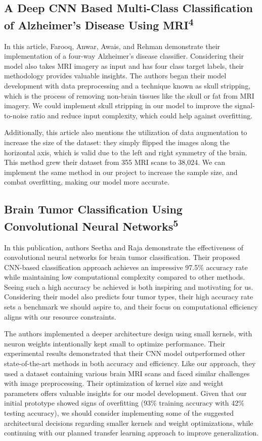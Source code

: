 \documentclass[conference]{IEEEtran}
\begin{document}
\subsection{\large A Deep CNN Based Multi-Class Classification of Alzheimer's Disease Using MRI\textsuperscript{4}}

In this article, Farooq, Anwar, Awais, and Rehman demonstrate their implementation of a four-way Alzheimer's disease classifier. Considering their model also takes MRI imagery as input and has four class target labels, their methodology provides valuable insights. The authors began their model development with data preprocessing and a technique known as skull stripping, which is the process of removing non-brain tissues like the skull or fat from MRI imagery. We could implement skull stripping in our model to improve the signal-to-noise ratio and reduce input complexity, which could help against overfitting. 

Additionally, this article also mentions the utilization of data augmentation to increase the size of the dataset: they simply flipped the images along the horizontal axis, which is valid due to the left and right symmetry of the brain. This method grew their dataset from 355 MRI scans to 38,024. We can implement the same method in our project to increase the sample size, and combat overfitting, making our model more accurate.

\subsection{\large Brain Tumor Classification Using Convolutional Neural Networks\textsuperscript{5}}

In this publication, authors Seetha and Raja demonstrate the effectiveness of convolutional neural networks for brain tumor classification. Their proposed CNN-based classification approach achieves an impressive 97.5\% accuracy rate while maintaining low computational complexity compared to other methods. Seeing such a high accuracy be achieved is both inspiring and motivating for us. Considering their model also predicts four tumor types, their high accuracy rate sets a benchmark we should aspire to, and their focus on computational efficiency aligns with our resource constraints. 

The authors implemented a deeper architecture design using small kernels, with neuron weights intentionally kept small to optimize performance. Their experimental results demonstrated that their CNN model outperformed other state-of-the-art methods in both accuracy and efficiency. Like our approach, they used a dataset containing various brain MRI scans and faced similar challenges with image preprocessing. Their optimization of kernel size and weight parameters offers valuable insights for our model development. Given that our initial prototype showed signs of overfitting (93\% training accuracy with 42\% testing accuracy), we should consider implementing some of the suggested architectural decisions regarding smaller kernels and weight optimizations, while continuing with our planned transfer learning approach to improve generalization.
\end{document}
